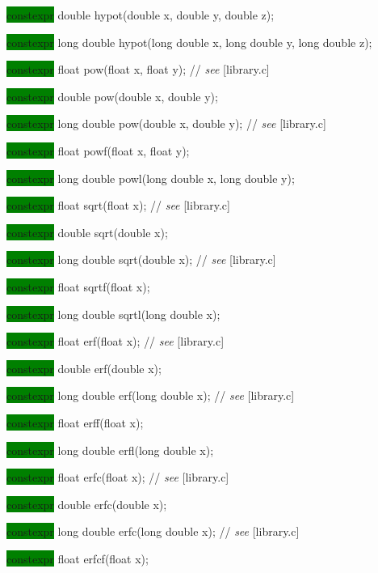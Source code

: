 \documentclass[prd,twocolumn,amsmath,amssymb,nofootinbib,eqsecnum]{revtex4-1}
\newcommand{\highlight}[1]{\colorbox{green}{\!\!\!\! #1}}
\newcommand{\stdcomment}[1]{{// {\it see} [#1]}}
\begin{document}
{\highlight{constexpr} double hypot(double x, double y, double z);

\highlight{constexpr} long double hypot(long double x, long double y, long double z);

\vspace{2ex}

\highlight{constexpr} float pow(float x, float y); \stdcomment{library.c}

\highlight{constexpr} double pow(double x, double y);

\highlight{constexpr} long double pow(double x, double y); \stdcomment{library.c}

\highlight{constexpr} float powf(float x, float y);

\highlight{constexpr} long double powl(long double x, long double y);

\vspace{2ex}


\highlight{constexpr} float sqrt(float x); \stdcomment{library.c}

\highlight{constexpr} double sqrt(double x);

\highlight{constexpr} long double sqrt(double x); \stdcomment{library.c}

\highlight{constexpr} float sqrtf(float x);

\highlight{constexpr} long double sqrtl(long double x);

\vspace{2ex}


\highlight{constexpr} float erf(float x); \stdcomment{library.c}

\highlight{constexpr} double erf(double x);

\highlight{constexpr} long double erf(long double x); \stdcomment{library.c}

\highlight{constexpr} float erff(float x);

\highlight{constexpr} long double erfl(long double x);

\vspace{2ex}

\highlight{constexpr} float erfc(float x); \stdcomment{library.c}

\highlight{constexpr} double erfc(double x);

\highlight{constexpr} long double erfc(long double x); \stdcomment{library.c}

\highlight{constexpr} float erfcf(float x);

}
\end{document}
